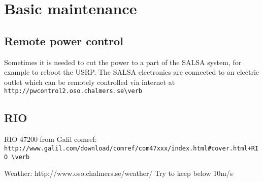 \chapter{Basic maintenance}

\section{Remote power control}
Sometimes it is needed to cut the power to a part of the SALSA system,
for example to reboot the USRP. The SALSA electronics are connected to an electric outlet which
can be remotely controlled via internet at 
\verb! http://pwcontrol2.oso.chalmers.se\verb!

\section{RIO}
RIO 47200 from Galil
comref: \verb! http://www.galil.com/download/comref/com47xxx/index.html#cover.html+RIO \verb!

Weather:
http://www.oso.chalmers.se/weather/
Try to keep below 10m/s
